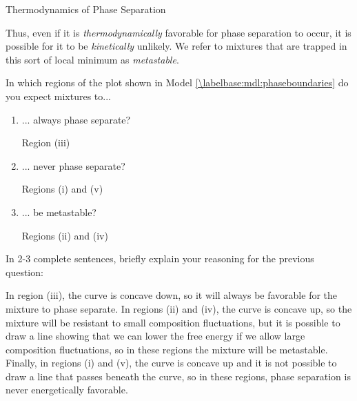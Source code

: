 \begin{activity}{Thermodynamics of Phase Separation}
\begin{infobox}
	Thus, even if it is \emph{thermodynamically} favorable for phase separation to occur, it is possible for it to be \emph{kinetically} unlikely.  We refer to mixtures that are trapped in this sort of local minimum as \emph{metastable}.
	
\end{infobox}

\begin{ctqs}
	\question In which regions of the plot shown in Model \ref{\labelbase:mdl:phaseboundaries} do you expect mixtures to...
		\begin{enumerate}
			\item ... always phase separate?
			
				\begin{solution}[0.5in]{}
				
					Region (iii)
				
				\end{solution}
			
			\item ... never phase separate?
			
				\begin{solution}[0.5in]{}
				
					Regions (i) and (v)
				
				\end{solution}
			
			\item ... be metastable?
			
				\begin{solution}[0.5in]{}
				
					Regions (ii) and (iv)
				
				\end{solution}
				
		\end{enumerate}
		
	\question In 2-3 complete sentences, briefly explain your reasoning for the previous question:
			
				\begin{solution}[2in]{}
				
					In region (iii), the curve is concave down, so it will always be favorable for the mixture to phase separate.  In regions (ii) and (iv), the curve is concave up, so the mixture will be resistant to small composition fluctuations, but it is possible to draw a line showing that we can lower the free energy if we allow large composition fluctuations, so in these regions the mixture will be metastable.  Finally, in regions (i) and (v), the curve is concave up and it is not possible to draw a line that passes beneath the curve, so in these regions, phase separation is never energetically favorable.
				

\end{solution}
\end{ctqs}
\end{activity}
